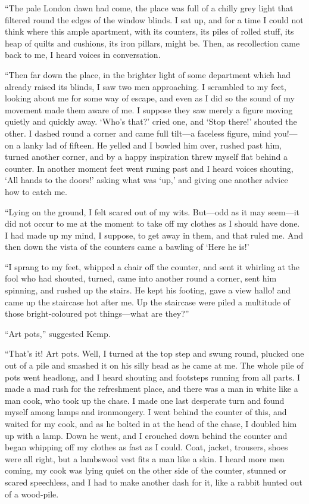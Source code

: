 “The pale London dawn had come, the place was full of a chilly grey light that filtered round the edges of the window blinds. I sat up, and for a time I could not think where this ample apartment, with its counters, its piles of rolled stuff, its heap of quilts and cushions, its iron pillars, might be. Then, as recollection came back to me, I heard voices in conversation.

“Then far down the place, in the brighter light of some department which had already raised its blinds, I saw two men approaching. I scrambled to my feet, looking about me for some way of escape, and even as I did so the sound of my movement made them aware of me. I suppose they saw merely a figure moving quietly and quickly away. ‘Who’s that?’ cried one, and ‘Stop there!’ shouted the other. I dashed round a corner and came full tilt—a faceless figure, mind you!—on a lanky lad of fifteen. He yelled and I bowled him over, rushed past him, turned another corner, and by a happy inspiration threw myself flat behind a counter. In another moment feet went runing past and I heard voices shouting, ‘All hands to the doors!’ asking what was ‘up,’ and giving one another advice how to catch me.

“Lying on the ground, I felt scared out of my wits. But—odd as it may seem—it did not occur to me at the moment to take off my clothes as I should have done. I had made up my mind, I suppose, to get away in them, and that ruled me. And then down the vista of the counters came a bawling of ‘Here he is!’

“I sprang to my feet, whipped a chair off the counter, and sent it whirling at the fool who had shouted, turned, came into another round a corner, sent him spinning, and rushed up the stairs. He kept his footing, gave a view hallo! and came up the staircase hot after me. Up the staircase were piled a multitude of those bright-coloured pot things—what are they?”

“Art pots,” suggested Kemp.

“That’s it! Art pots. Well, I turned at the top step and swung round, plucked one out of a pile and smashed it on his silly head as he came at me. The whole pile of pots went headlong, and I heard shouting and footsteps running from all parts. I made a mad rush for the refreshment place, and there was a man in white like a man cook, who took up the chase. I made one last desperate turn and found myself among lamps and ironmongery. I went behind the counter of this, and waited for my cook, and as he bolted in at the head of the chase, I doubled him up with a lamp. Down he went, and I crouched down behind the counter and began whipping off my clothes as fast as I could. Coat, jacket, trousers, shoes were all right, but a lambswool vest fits a man like a skin. I heard more men coming, my cook was lying quiet on the other side of the counter, stunned or scared speechless, and I had to make another dash for it, like a rabbit hunted out of a wood-pile.

